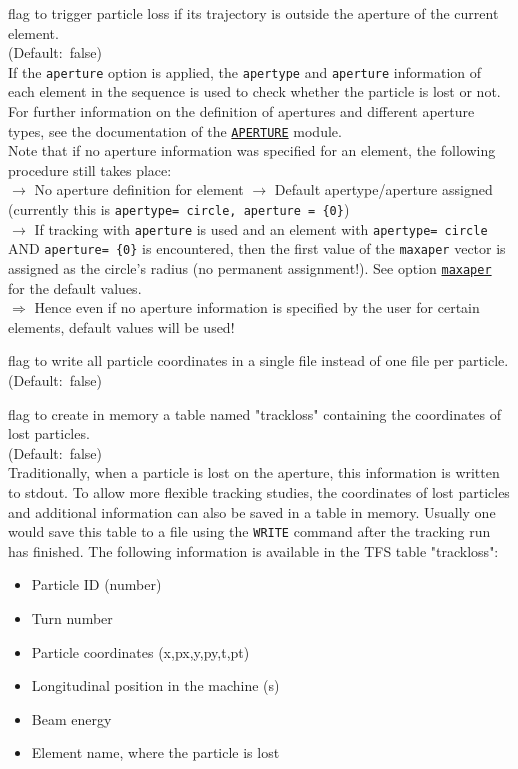 \begin{madlist}
   flag to trigger particle loss if its trajectory is
  outside the aperture of the current element. \\ 
  (Default:~false) \\
  If the \texttt{aperture} option is applied, the \texttt{apertype} 
  and \texttt{aperture} information of each element in the sequence
  is used to check whether the particle is lost or not. For further
  information on the definition of apertures and different aperture
  types, see the documentation of the
  \href{../Introduction/aperture.html}{\texttt{APERTURE}} module. \\  
  Note that if no aperture information was specified for an element, 
  the following procedure still takes place:
  \\
  $\rightarrow$ No aperture definition for element $\rightarrow$ 
  Default apertype/aperture assigned (currently this is   
  \texttt{apertype= circle, aperture = \{0\}}) 
  \\ $\rightarrow$  
  If tracking with \texttt{aperture} is used and an
  element with \texttt{apertype= circle} AND \texttt{aperture= \{0\}}  
  is encountered, then the first value of the \texttt{maxaper} vector
  is assigned as the circle's radius (no permanent assignment!). 
  See option \hyperlink{run}{\texttt{maxaper}} for the default values. 
  \\ $\Rightarrow$
  Hence even if no aperture information is specified by the user for
  certain elements, default values will be used! 


   flag to write all particle coordinates in a single
  file instead of one file per particle. \\ (Default:~false)

   flag to create in memory a table named "trackloss"
  containing the coordinates of lost particles.\\
  (Default:~false) \\
  Traditionally, when a particle is lost on the aperture, this information
  is written to stdout. To allow more flexible tracking studies, the
  coordinates of lost particles and additional information can also be
  saved in a table in memory. Usually one would save this table to a
  file using the \texttt{WRITE} command after the tracking run has
  finished. The following information is available in the TFS table
  "trackloss":          
  \begin{itemize}
  \item Particle ID (number)
  \item Turn number
  \item Particle coordinates (x,px,y,py,t,pt)
  \item Longitudinal position in the machine (s)
  \item Beam energy
  \item Element name, where the particle is lost
  \end{itemize}


\end{madlist}
